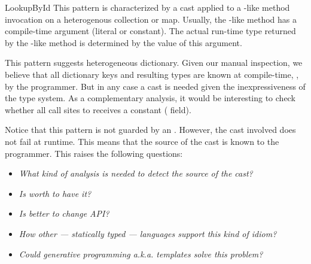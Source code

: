 \begin{pattern}{LookupById}
\detection{}
This pattern is characterized by a cast applied to a -like method invocation on a heterogenous collection or map.
Usually, the -like method has a compile-time argument (literal or constant).
The actual run-time type returned by the -like method is determined by the value of this argument.

\discussion{}
%
%
This pattern suggests heterogeneous dictionary.
Given our manual inspection,
we believe that all dictionary keys and resulting types are known at
compile-time, \ie, by the programmer.
%
%
But in any case a cast is needed given the inexpressiveness of the type system.
As a complementary analysis,
it would be interesting to check whether all call sites to
 receives a constant ( field).

Notice that this pattern is not guarded by an .
However, the cast involved does not fail at runtime.
This means that the source of the cast is known to the programmer.
This raises the following questions:
\begin{itemize}
\item \emph{What kind of analysis is needed to detect the source of the cast?}
\item \emph{Is worth to have it?}
\item \emph{Is better to change API?}
\item \emph{How other --- statically typed --- languages support this kind of idiom?}
\item \emph{Could generative programming a.k.a. templates solve this problem?}
\end{itemize}

\related{}

\end{pattern}